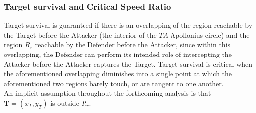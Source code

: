 \documentclass{beamer}
\begin{document}
\begin{frame}
\frametitle{Target survival and Critical Speed Ratio}
Target survival is guaranteed if there is an overlapping of the region reachable by the Target before the Attacker (the interior of the $TA$ Apollonius circle) and the region $R_r$ reachable by the Defender before the Attacker, since within this overlapping, the Defender can perform its intended role of intercepting the Attacker before the Attacker captures the Target. Target survival is critical when the aforementioned overlapping diminishes into a single point at which the aforementioned two regions barely touch, or are tangent to one another.\\

 An implicit assumption throughout the forthcoming analysis is that $\boldsymbol{T}=(x_T , y_T)$ is outside $R_r$. 
\end{frame}
\end{document}
